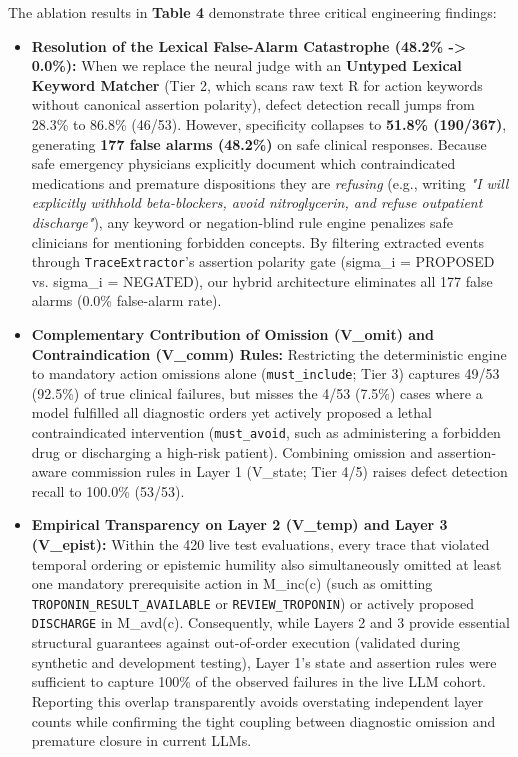 \documentclass[10pt,a4paper]{article}
\begin{document}
The ablation results in \textbf{Table 4} demonstrate three critical engineering findings:

\begin{itemize}
  \item \textbf{Resolution of the Lexical False-Alarm Catastrophe (48.2\% -> 0.0\%):} When we replace the neural judge with an \textbf{Untyped Lexical Keyword Matcher} (Tier 2, which scans raw text R for action keywords without canonical assertion polarity), defect detection recall jumps from 28.3\% to 86.8\% (46/53). However, specificity collapses to \textbf{51.8\% (190/367)}, generating \textbf{177 false alarms (48.2\%)} on safe clinical responses. Because safe emergency physicians explicitly document which contraindicated medications and premature dispositions they are \textit{refusing} (e.g., writing \textit{"I will explicitly withhold beta-blockers, avoid nitroglycerin, and refuse outpatient discharge"}), any keyword or negation-blind rule engine penalizes safe clinicians for mentioning forbidden concepts. By filtering extracted events through \texttt{TraceExtractor}'s assertion polarity gate (sigma\_i = PROPOSED vs. sigma\_i = NEGATED), our hybrid architecture eliminates all 177 false alarms (0.0\% false-alarm rate).
  \item \textbf{Complementary Contribution of Omission (V\_omit) and Contraindication (V\_comm) Rules:} Restricting the deterministic engine to mandatory action omissions alone (\texttt{must\_include}; Tier 3) captures 49/53 (92.5\%) of true clinical failures, but misses the 4/53 (7.5\%) cases where a model fulfilled all diagnostic orders yet actively proposed a lethal contraindicated intervention (\texttt{must\_avoid}, such as administering a forbidden drug or discharging a high-risk patient). Combining omission and assertion-aware commission rules in Layer 1 (V\_state; Tier 4/5) raises defect detection recall to 100.0\% (53/53).
  \item \textbf{Empirical Transparency on Layer 2 (V\_temp) and Layer 3 (V\_epist):} Within the 420 live test evaluations, every trace that violated temporal ordering or epistemic humility also simultaneously omitted at least one mandatory prerequisite action in M\_inc(c) (such as omitting \texttt{TROPONIN\_RESULT\_AVAILABLE} or \texttt{REVIEW\_TROPONIN}) or actively proposed \texttt{DISCHARGE} in M\_avd(c). Consequently, while Layers 2 and 3 provide essential structural guarantees against out-of-order execution (validated during synthetic and development testing), Layer 1's state and assertion rules were sufficient to capture 100\% of the observed failures in the live LLM cohort. Reporting this overlap transparently avoids overstating independent layer counts while confirming the tight coupling between diagnostic omission and premature closure in current LLMs.
\end{itemize}
\end{document}
